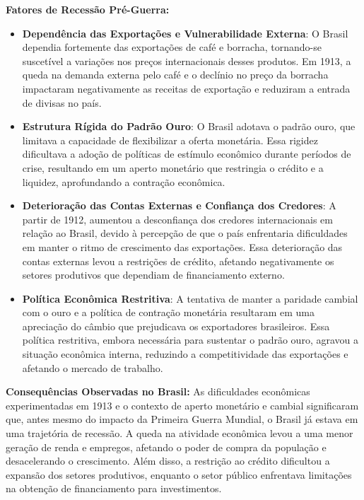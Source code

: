 \documentclass[a4paper,12pt]{article}[abntex2]
\begin{document}
\textbf{Fatores de Recessão Pré-Guerra:}
\begin{itemize}
    \item \textbf{Dependência das Exportações e Vulnerabilidade Externa}: O Brasil dependia fortemente das exportações de café e borracha, tornando-se suscetível a variações nos preços internacionais desses produtos. Em 1913, a queda na demanda externa pelo café e o declínio no preço da borracha impactaram negativamente as receitas de exportação e reduziram a entrada de divisas no país.
    
    \item \textbf{Estrutura Rígida do Padrão Ouro}: O Brasil adotava o padrão ouro, que limitava a capacidade de flexibilizar a oferta monetária. Essa rigidez dificultava a adoção de políticas de estímulo econômico durante períodos de crise, resultando em um aperto monetário que restringia o crédito e a liquidez, aprofundando a contração econômica.
    
    \item \textbf{Deterioração das Contas Externas e Confiança dos Credores}: A partir de 1912, aumentou a desconfiança dos credores internacionais em relação ao Brasil, devido à percepção de que o país enfrentaria dificuldades em manter o ritmo de crescimento das exportações. Essa deterioração das contas externas levou a restrições de crédito, afetando negativamente os setores produtivos que dependiam de financiamento externo.
    
    \item \textbf{Política Econômica Restritiva}: A tentativa de manter a paridade cambial com o ouro e a política de contração monetária resultaram em uma apreciação do câmbio que prejudicava os exportadores brasileiros. Essa política restritiva, embora necessária para sustentar o padrão ouro, agravou a situação econômica interna, reduzindo a competitividade das exportações e afetando o mercado de trabalho.
\end{itemize}

\textbf{Consequências Observadas no Brasil:}
As dificuldades econômicas experimentadas em 1913 e o contexto de aperto monetário e cambial significaram que, antes mesmo do impacto da Primeira Guerra Mundial, o Brasil já estava em uma trajetória de recessão. A queda na atividade econômica levou a uma menor geração de renda e empregos, afetando o poder de compra da população e desacelerando o crescimento. Além disso, a restrição ao crédito dificultou a expansão dos setores produtivos, enquanto o setor público enfrentava limitações na obtenção de financiamento para investimentos.
\end{document}
